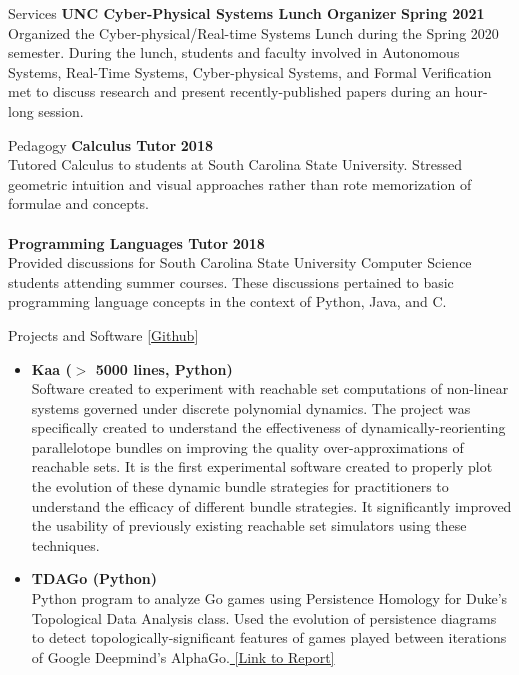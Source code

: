 \documentclass{resume} %
\begin{document}
\begin{rSection}{Services}
  {\bf UNC Cyber-Physical Systems Lunch Organizer} \hfill {\bf Spring 2021}\\
  Organized the Cyber-physical/Real-time Systems Lunch during the Spring 2020 semester. During the lunch, students and faculty involved in Autonomous Systems, Real-Time Systems, Cyber-physical Systems, and Formal Verification met to discuss research and present recently-published papers during an hour-long session.
\end{rSection}

\begin{rSection}{Pedagogy}
{\bf Calculus Tutor} \hfill {\bf 2018} \\
Tutored Calculus to students at South Carolina State University. Stressed geometric intuition and visual approaches rather than rote memorization of formulae and concepts. \\
\\
{\bf Programming Languages Tutor} \hfill {\bf 2018} \\
Provided discussions for South Carolina State University Computer Science students attending summer courses. These discussions pertained to basic programming language concepts in the context of Python, Java, and C. \\
\end{rSection}
\newpage

\begin{rSection}{Projects and Software [\href{https://github.com/ekim1919}{Github}]}
  \begin{itemize}
    \item {\bf Kaa ($>$ 5000 lines, Python)} \\
    Software created to experiment with reachable set computations of non-linear systems governed under discrete polynomial dynamics. The project was specifically created to understand the effectiveness of dynamically-reorienting parallelotope bundles on improving the quality over-approximations of reachable sets. It is the first experimental software created to properly plot the evolution of these dynamic bundle strategies for practitioners to understand the efficacy of different bundle strategies. It significantly improved the usability of previously existing reachable set simulators using these techniques.
    \item {\bf TDAGo (Python)} \\
    Python program to analyze Go games using Persistence Homology for Duke's Topological Data Analysis class. Used the evolution of persistence diagrams to detect topologically-significant features of games played between iterations of Google Deepmind's AlphaGo.\href{https://github.com/ekim1919/TDAGo/blob/master/paper/final.pdf}{ [Link to Report] }
  \end{itemize}
\end{rSection}
\end{document}
